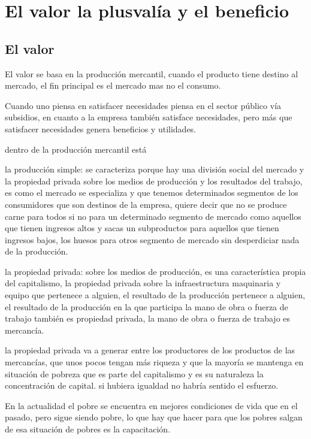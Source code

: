 \documentclass[
  a4paper,
]{article}
\begin{document}
\hypertarget{el-valor-la-plusvaluxeda-y-el-beneficio}{%
\section{El valor la plusvalía y el
beneficio}\label{el-valor-la-plusvaluxeda-y-el-beneficio}}

\hypertarget{el-valor}{%
\subsection{El valor}\label{el-valor}}

El valor se basa en la producción mercantil, cuando el producto tiene
destino al mercado, el fin principal es el mercado mas no el consumo.

Cuando uno piensa en satisfacer necesidades piensa en el sector público
vía subsidios, en cuanto a la empresa también satisface necesidades,
pero más que satisfacer necesidades genera beneficios y utilidades.

dentro de la producción mercantil está

la producción simple: se caracteriza porque hay una división social del
mercado y la propiedad privada sobre los medios de producción y los
resultados del trabajo, es como el mercado se especializa y que tenemos
determinados segmentos de los consumidores que son destinos de la
empresa, quiere decir que no se produce carne para todos si no para un
determinado segmento de mercado como aquellos que tienen ingresos altos
y sacas un subproductos para aquellos que tienen ingresos bajos, los
huesos para otros segmento de mercado sin desperdiciar nada de la
producción.

la propiedad privada: sobre los medios de producción, es una
característica propia del capitalismo, la propiedad privada sobre la
infraestructura maquinaria y equipo que pertenece a alguien, el
resultado de la producción pertenece a alguien, el resultado de la
producción en la que participa la mano de obra o fuerza de trabajo
también es propiedad privada, la mano de obra o fuerza de trabajo es
mercancía.

la propiedad privada va a generar entre los productores de los productos
de las mercancías, que unos pocos tengan más riqueza y que la mayoría se
mantenga en situación de pobreza que es parte del capitalismo y es su
naturaleza la concentración de capital. si hubiera igualdad no habría
sentido el esfuerzo.

En la actualidad el pobre se encuentra en mejores condiciones de vida
que en el pasado, pero sigue siendo pobre, lo que hay que hacer para que
los pobres salgan de esa situación de pobres es la capacitación.
\end{document}
